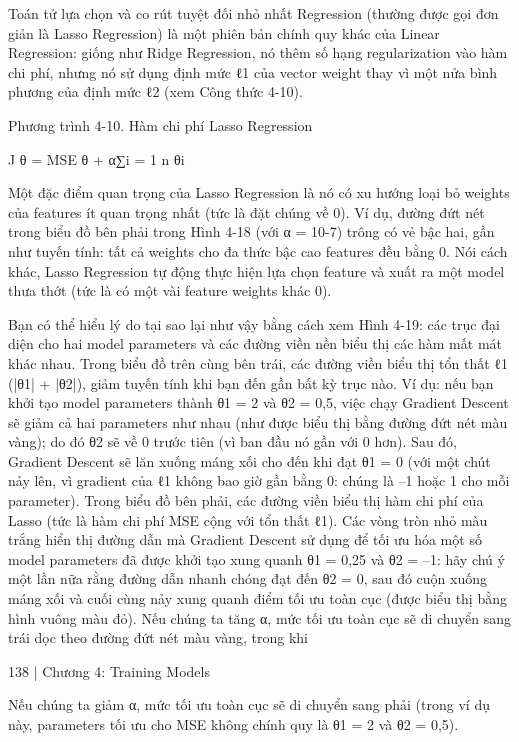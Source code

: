 Toán tử lựa chọn và co rút tuyệt đối nhỏ nhất Regression (thường được gọi đơn giản là Lasso Regression) là một phiên bản chính quy khác của Linear Regression: giống như Ridge Regression, nó thêm số hạng regularization vào hàm chi phí, nhưng nó sử dụng định mức ℓ1 của vector weight thay vì một nửa bình phương của định mức ℓ2 (xem Công thức 4-10).

Phương trình 4-10. Hàm chi phí Lasso Regression

J θ = MSE θ + α∑i = 1 n θi

Một đặc điểm quan trọng của Lasso Regression là nó có xu hướng loại bỏ weights của features ít quan trọng nhất (tức là đặt chúng về 0). Ví dụ, đường đứt nét trong biểu đồ bên phải trong Hình 4-18 (với α = 10-7) trông có vẻ bậc hai, gần như tuyến tính: tất cả weights cho đa thức bậc cao features đều bằng 0. Nói cách khác, Lasso Regression tự động thực hiện lựa chọn feature và xuất ra một model thưa thớt (tức là có một vài feature weights khác 0).

Bạn có thể hiểu lý do tại sao lại như vậy bằng cách xem Hình 4-19: các trục đại diện cho hai model parameters và các đường viền nền biểu thị các hàm mất mát khác nhau. Trong biểu đồ trên cùng bên trái, các đường viền biểu thị tổn thất ℓ1 (|θ1| + |θ2|), giảm tuyến tính khi bạn đến gần bất kỳ trục nào. Ví dụ: nếu bạn khởi tạo model parameters thành θ1 = 2 và θ2 = 0,5, việc chạy Gradient Descent sẽ giảm cả hai parameters như nhau (như được biểu thị bằng đường đứt nét màu vàng); do đó θ2 sẽ về 0 trước tiên (vì ban đầu nó gần với 0 hơn). Sau đó, Gradient Descent sẽ lăn xuống máng xối cho đến khi đạt θ1 = 0 (với một chút nảy lên, vì gradient của ℓ1 không bao giờ gần bằng 0: chúng là –1 hoặc 1 cho mỗi parameter). Trong biểu đồ bên phải, các đường viền biểu thị hàm chi phí của Lasso (tức là hàm chi phí MSE cộng với tổn thất ℓ1). Các vòng tròn nhỏ màu trắng hiển thị đường dẫn mà Gradient Descent sử dụng để tối ưu hóa một số model parameters đã được khởi tạo xung quanh θ1 = 0,25 và θ2 = –1: hãy chú ý một lần nữa rằng đường dẫn nhanh chóng đạt đến θ2 = 0, sau đó cuộn xuống máng xối và cuối cùng nảy xung quanh điểm tối ưu toàn cục (được biểu thị bằng hình vuông màu đỏ). Nếu chúng ta tăng α, mức tối ưu toàn cục sẽ di chuyển sang trái dọc theo đường đứt nét màu vàng, trong khi

138 | Chương 4: Training Models

Nếu chúng ta giảm α, mức tối ưu toàn cục sẽ di chuyển sang phải (trong ví dụ này, parameters tối ưu cho MSE không chính quy là θ1 = 2 và θ2 = 0,5).


